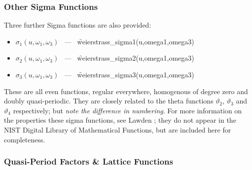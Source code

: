 \subsubsection{Other Sigma Functions}
\hypertarget{SIGMA1}{}
\hypertarget{operator:WEIERSTRASS_SIGMA1}{}
\hypertarget{operator:WEIERSTRASS_SIGMA2}{}
\hypertarget{operator:WEIERSTRASS_SIGMA3}{}

Three further Sigma functions are also provided:
\begin{itemize}
\item $\sigma_1(u, \omega_1, \omega_3)$ \ --- \ \f{weierstrass\_sigma1(u,omega1,omega3)}
\item $\sigma_2(u, \omega_1, \omega_3)$ \ --- \ \f{weierstrass\_sigma2(u,omega1,omega3)}
\item $\sigma_3(u, \omega_1, \omega_3)$ \ --- \ \f{weierstrass\_sigma3(u,omega1,omega3)}
\end{itemize}
These are all even functions, regular everywhere, homogenous of degree zero and doubly quasi-periodic. They are closely related to the
theta functions $\vartheta_2$, $\vartheta_3$ and $\vartheta_4$ respectively; but \emph{note the difference in numbering}.
For more information on the properties these sigma functions, see Lawden \cite{Lawden:89};
they do not appear in the NIST Digital Library of Mathematical Functions, but are included here for completeness.

\subsubsection{ Quasi-Period Factors \& Lattice Functions}
\hypertarget{ETA}{}
\hypertarget{operator:LATTICE_E1}{}
\hypertarget{operator:LATTICE_E2}{}
\hypertarget{operator:LATTICE_E3}{}
\hypertarget{operator:LATTICE_G}{}
\hypertarget{operator:LATTICE_DELTA}{}
\hypertarget{operator:LATTICE_G2}{}
\hypertarget{operator:LATTICE_G3}{}

